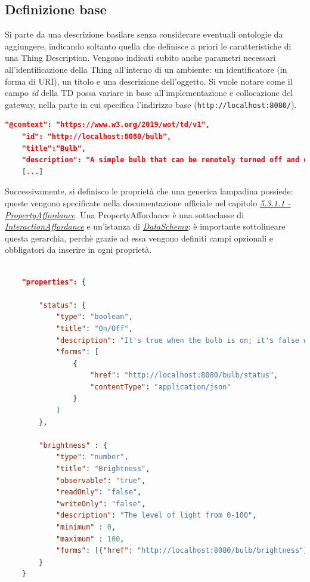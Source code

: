 \documentclass[12pt,a4paper,openright,oneside]{report}
\begin{document}
\subsection{Definizione base}
Si parte da una descrizione basilare senza considerare eventuali ontologie da aggiungere, indicando soltanto quella che definisce a priori le caratteristiche di una Thing Description. Vengono indicati subito anche parametri necessari all'identificazione della Thing all'interno di un ambiente: un identificatore (in forma di URI), un titolo e una descrizione dell'oggetto. Si vuole notare come il campo \textit{id} della TD possa variare in base all'implementazione e collocazione del gateway, nella parte in cui specifica l'indirizzo base (\texttt{http://localhost:8080/}).\\

\begin{lstlisting}[language=json,caption={Inizio di una TD della lampadina},label=lst:start-td-lamp]
	"@context": "https://www.w3.org/2019/wot/td/v1",
	"id": "http://localhost:8080/bulb",
	"title":"Bulb",
	"description": "A simple bulb that can be remotely turned off and on, with possibility to regulate its intensity.",
	[...]
\end{lstlisting}

Successivamente, si definisco le proprietà che una generica lampadina possiede: queste vengono specificate nella documentazione ufficiale nel capitolo \textit{\href{https://www.w3.org/TR/wot-thing-description/\#propertyaffordance}{5.3.1.1 - PropertyAffordance}}. Una PropertyAffordance è una sottoclasse di \textit{\href{https://www.w3.org/TR/wot-thing-description/\#interactionaffordance}{InteractionAffordance}} e un'istanza di \textit{\href{https://www.w3.org/TR/wot-thing-description/\#dataschema}{DataSchema}}: è importante sottolineare questa gerarchia, perchè grazie ad essa vengono definiti campi opzionali e obbligatori da inserire in ogni proprietà.

\clearpage
\begin{lstlisting}[language=json,caption={Proprietà di una lampadina},label=lst:start3-td-lamp]
	
	"properties": {
		
		"status": {
			"type": "boolean",
			"title": "On/Off",
			"description": "It's true when the bulb is on; it's false when turned off",
			"forms": [
				{
					"href": "http://localhost:8080/bulb/status",
					"contentType": "application/json"
				}
			]
		},
		
		"brightness" : {
			"type": "number",
			"title": "Brightness",
            "observable": "true",
            "readOnly": "false",
            "writeOnly": "false",
			"description": "The level of light from 0-100",
			"minimum" : 0,
			"maximum" : 100,
			"forms": [{"href": "http://localhost:8080/bulb/brightness"}]
		}
	}
\end{lstlisting}
\end{document}
